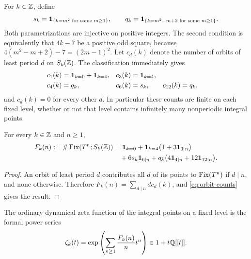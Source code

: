 For $k\in\mathbb Z$, define
\begin{equation}\label{eq:indicators}
 s_k=\mathbf 1_{\{k=m^2\text{ for some }m\geq1\}},\qquad
 q_k=\mathbf 1_{\{k=m^2-m+2\text{ for some }m\geq1\}}.
\end{equation}
Both parametrizations are injective on positive integers. The second
condition is equivalently that $4k-7$ be a positive odd square,
because $4(m^2-m+2)-7=(2m-1)^2$.
Let $c_d(k)$ denote the number of orbits of least period $d$ on
$S_k(\mathbb Z)$. The classification immediately gives
\begin{align}
 c_1(k)&=\mathbf 1_{k=0}+\mathbf 1_{k=4},&
 c_3(k)&=\mathbf 1_{k=4},\nonumber\\
 c_4(k)&=q_k,& c_6(k)&=s_k,& c_{12}(k)&=q_k,
 \label{eq:orbit-counts}
\end{align}
and $c_d(k)=0$ for every other $d$. In particular these counts
are finite on each fixed level, whether or not that level contains
infinitely many nonperiodic integral points.

\begin{corollary}\label{cor:fixed}
For every $k\in\mathbb Z$ and $n\geq1$,
\begin{align}
 F_k(n):=\#\operatorname{Fix}(T^n;S_k(\mathbb Z))
 &=\mathbf 1_{k=0}+\mathbf 1_{k=4}\bigl(1+3\mathbf 1_{3\mid n}\bigr)
 \nonumber\\
 &\quad+6s_k\mathbf 1_{6\mid n}
 +q_k\bigl(4\mathbf 1_{4\mid n}+12\mathbf 1_{12\mid n}\bigr).
 \label{eq:fixed-counts}
\end{align}
\end{corollary}
\begin{proof}
An orbit of least period $d$ contributes all $d$ of its points
to $\operatorname{Fix}(T^n)$ if $d\mid n$, and none otherwise. Therefore
$F_k(n)=\sum_{d\mid n}dc_d(k)$, and
\eqref{eq:orbit-counts} gives the result.
\end{proof}

\begin{definition}
The ordinary dynamical zeta function of the integral points on a
fixed level is the formal power series
\begin{equation}\label{eq:zeta-definition}
 \zeta_k(t)=\exp\left(\sum_{n\geq1}\frac{F_k(n)}{n}t^n\right)
 \in 1+t\mathbb Q[[t]].
\end{equation}
\end{definition}

